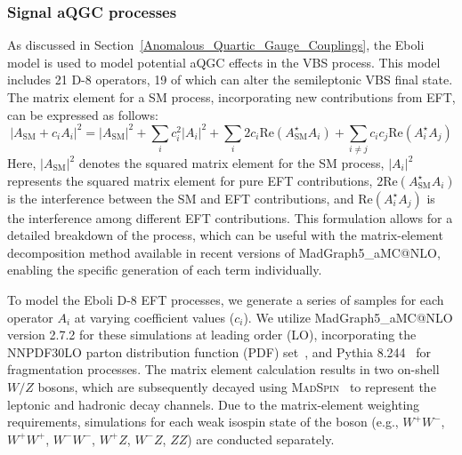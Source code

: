 \clearpage
\subsubsection{Signal aQGC processes}
\label{subsec:agc_sample}

As discussed in Section~\ref{Anomalous_Quartic_Gauge_Couplings}, the Eboli model is used to model potential aQGC effects in the VBS process. This model includes 21 D-8 operators, 19 of which can alter the semileptonic VBS final state.
The matrix element for a SM process, incorporating new contributions from EFT, can be expressed as follows:
\begin{equation}
  |A_{\text{SM}} + c_i A_i|^2 = |A_{\text{SM}}|^2 + \sum\limits_i c_i^2 |A_i|^2 + \sum\limits_i 2 c_i \mathrm{Re}(A_{\text{SM}}^\star A_i) + \sum\limits_{i \neq j} c_i c_j \mathrm{Re}(A_i^\star A_j)
\end{equation}
Here, $|A_{\text{SM}}|^2$ denotes the squared matrix element for the SM process, $|A_i|^2$ represents the squared matrix element for pure EFT contributions, $2 \mathrm{Re}(A_{\text{SM}}^\star A_i)$ is the interference between the SM and EFT contributions, and $\mathrm{Re}(A_i^\star A_j)$ is the interference among different EFT contributions. This formulation allows for a detailed breakdown of the process, which can be useful with the matrix-element decomposition method available in recent versions of MadGraph5\_aMC@NLO, enabling the specific generation of each term individually.

To model the Eboli D-8 EFT processes, we generate a series of samples for each operator \(A_i\) at varying coefficient values (\(c_i\)). We utilize MadGraph5\_aMC@NLO version 2.7.2 for these simulations at leading order (LO), incorporating the NNPDF30LO parton distribution function (PDF) set~\cite{Ball:2012cx}, and Pythia 8.244~\cite{Sjostrand:2007gs} for fragmentation processes. The matrix element calculation results in two on-shell \(W/Z\) bosons, which are subsequently decayed using \textsc{MadSpin}~\cite{Artoisenet:2012st} to represent the leptonic and hadronic decay channels. Due to the matrix-element weighting requirements, simulations for each weak isospin state of the boson (e.g., \(W^+W^-\), \(W^+W^+\), \(W^-W^-\), \(W^+Z\), \(W^-Z\), \(ZZ\)) are conducted separately.


